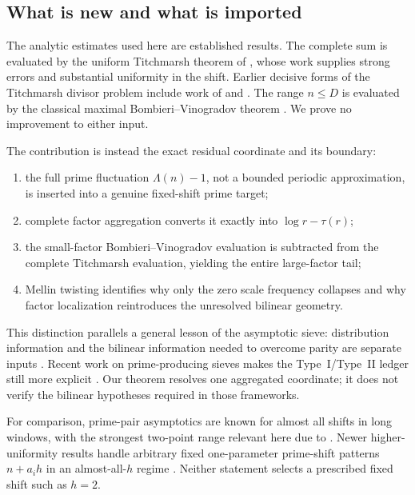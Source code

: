 \subsection{What is new and what is imported}

The analytic estimates used here are established results.  The complete
sum is evaluated by the uniform Titchmarsh theorem of
\citet{AssingBlomerLi2021}, whose work supplies strong errors and substantial
uniformity in the shift.  Earlier decisive forms of the Titchmarsh divisor
problem include work of \citet{Fouvry1985} and
\citet{BombieriFriedlanderIwaniec1986}.  The range $n\leq D$ is evaluated by
the classical maximal Bombieri--Vinogradov theorem
\citep{Bombieri1965,Vinogradov1965}.  We prove no improvement to either
input.

The contribution is instead the exact residual coordinate and its boundary:
\begin{enumerate}[label=\textup{(\roman*)}]
 \item the full prime fluctuation $\Lambda(n)-1$, not a bounded periodic
 approximation, is inserted into a genuine fixed-shift prime target;
 \item complete factor aggregation converts it exactly into
 $\log r-\tau(r)$;
 \item the small-factor Bombieri--Vinogradov evaluation is subtracted from
 the complete Titchmarsh evaluation, yielding the entire large-factor tail;
 \item Mellin twisting identifies why only the zero scale frequency
 collapses and why factor localization reintroduces the unresolved bilinear
 geometry.
\end{enumerate}

This distinction parallels a general lesson of the asymptotic sieve:
distribution information and the bilinear information needed to overcome
parity are separate inputs \citep{FriedlanderIwaniec1998}.  Recent work on
prime-producing sieves makes the Type~I/Type~II ledger still more explicit
\citep{FordMaynard2024}.  Our theorem resolves one aggregated coordinate; it
does not verify the bilinear hypotheses required in those frameworks.

For comparison, prime-pair asymptotics are known for almost all shifts in
long windows, with the strongest two-point range relevant here due to
\citet{MatomakiRadziwillTao2019}.  Newer higher-uniformity results handle
arbitrary fixed one-parameter prime-shift patterns $n+a_i h$ in an
almost-all-$h$ regime
\citep{MatomakiRadziwillShaoTaoTeravainen2026}.  Neither statement selects a
prescribed fixed shift such as $h=2$.

